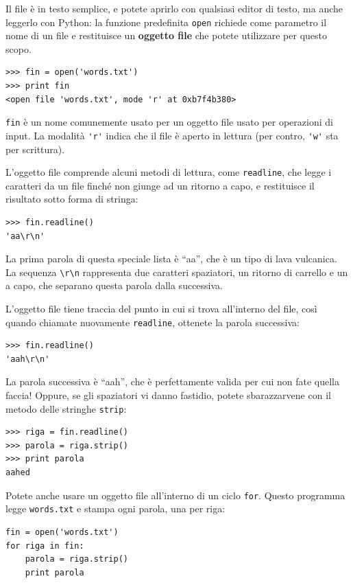 \documentclass[10pt]{book}
\begin{document}
Il file è in testo semplice, e potete aprirlo con qualsiasi editor di testo, ma anche leggerlo con Python: la funzione predefinita {\tt open} richiede come parametro il nome di un file e restituisce un {\bf oggetto file} che potete utilizzare per questo scopo.

\begin{verbatim}
>>> fin = open('words.txt')
>>> print fin
<open file 'words.txt', mode 'r' at 0xb7f4b380>
\end{verbatim}
%
{\tt fin} è un nome comunemente usato per un oggetto file usato per operazioni di input. La modalità \verb"'r'" indica che il file è aperto in lettura (per contro, \verb"'w'" sta per scrittura).

L'oggetto file comprende alcuni metodi di lettura, come {\tt readline}, che legge i caratteri da un file finché non giunge ad un ritorno a capo, e restituisce il risultato sotto forma di stringa:

\begin{verbatim}
>>> fin.readline()
'aa\r\n'
\end{verbatim}
%
La prima parola di questa speciale lista è ``aa'', che è un tipo di lava vulcanica. La sequenza \verb"\r\n" rappresenta due caratteri spaziatori, un ritorno di carrello e un a capo, che separano questa parola dalla successiva.

L'oggetto file tiene traccia del punto in cui si trova all'interno del file, così quando chiamate nuovamente {\tt readline}, ottenete la parola successiva:

\begin{verbatim}
>>> fin.readline()
'aah\r\n'
\end{verbatim}
%
La parola successiva è ``aah'', che è perfettamente valida per cui non fate quella faccia! Oppure, se gli spaziatori vi danno fastidio, potete sbarazzarvene con il metodo delle stringhe {\tt strip}:

\begin{verbatim}
>>> riga = fin.readline()
>>> parola = riga.strip()
>>> print parola
aahed
\end{verbatim}
%
Potete anche usare un oggetto file all'interno di un ciclo {\tt for}.
Questo programma legge {\tt words.txt} e stampa ogni parola, una per riga:

\begin{verbatim}
fin = open('words.txt')
for riga in fin:
    parola = riga.strip()
    print parola
\end{verbatim}
%
\end{document}
